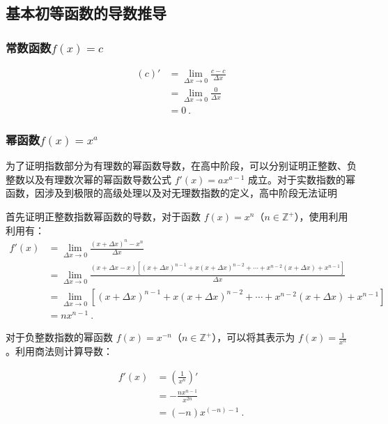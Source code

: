 \subsection{基本初等函数的导数推导}

\subsubsection{常数函数$f(x)=c$}

\begin{equation}
\begin{split}
(c)'&=\lim_{\Delta x\to 0}\frac{c-c}{\Delta x}\\
&=\lim_{\Delta x\to 0}\frac{0}{\Delta x}\\
&=0~.
\end{split}
\end{equation}

\subsubsection{幂函数$f(x)=x^a$}

为了证明指数部分为有理数的幂函数导数，在高中阶段，可以分别证明正整数、负整数以及有理数次幂的幂函数导数公式 $f'(x) = ax^{a-1}$ 成立。对于实数指数的幂函数，因涉及到极限的高级处理以及对无理数指数的定义，高中阶段无法证明

首先证明正整数指数幂函数的导数，对于函数 $f(x) = x^n$（$n \in \mathbb{Z}^+$），使用利用利用有：
\begin{equation}
\begin{split}
f'(x) &= \lim_{\Delta x \to 0} \frac{(x+\Delta x)^n - x^n}{\Delta x}\\
&=\lim_{\Delta x \to 0} \frac{(x+\Delta x-x)[(x+\Delta x)^{n-1}+x(x+\Delta x)^{n-2}+\cdots+x^{n-2}(x+\Delta x)+x^{n-1}]}{\Delta x}\\
&=\lim_{\Delta x \to 0} [(x+\Delta x)^{n-1}+x(x+\Delta x)^{n-2}+\cdots+x^{n-2}(x+\Delta x)+x^{n-1}]\\
&=nx^{n-1}~.
\end{split}
\end{equation}

对于负整数指数的幂函数 $f(x) = x^{-n}$（$n \in \mathbb{Z}^+$），可以将其表示为 $f(x) = \frac{1}{x^{n}}$。利用商法则计算导数：

\begin{equation}
\begin{split}
f'(x) &= \left(\frac{1}{x^n}\right)' \\
&=-\frac{nx^{n-1}}{x^{2n}}\\
&=(-n)x^{(-n)-1}~.
\end{split}
\end{equation}


